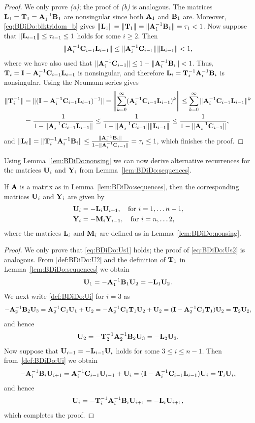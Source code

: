\begin{proof}
We only prove \emph{(a)}; the proof of \emph{(b)} is analogous.
%
The matrices $\mathbf{L}_1=\mathbf{T}_1=\mathbf{A}_1^{-1}\mathbf{B}_1$ are nonsingular since both $\mathbf{A}_1$ and
$\mathbf{B}_1$ are. Moreover, \eqref{eq:BDiDo:blktridom_b} gives
%
$\|\mathbf{L}_1\|=\|\mathbf{T}_1\|=\|\mathbf{A}_1^{-1}\mathbf{B}_1\|=\tau_1<1$.
%
Now suppose that $\|\mathbf{L}_{i-1}\| \leq \tau_{i-1}\leq 1$ holds for some $i\geq 2$.
Then
%
\[\|\mathbf{A}_i^{-1}\mathbf{C}_{i-1}\mathbf{L}_{i-1}\|\leq\|\mathbf{A}_i^{-1}\mathbf{C}_{i-1}\|\|\mathbf{L}_{i-1}\|<1,\]
%
where we have also used that $\|\mathbf{A}_i^{-1}\mathbf{C}_{i-1}\|\leq 1-\|\mathbf{A}_i^{-1}\mathbf{B}_i\|<1$.
Thus,\linebreak
$\mathbf{T}_i=\mathbf{I}-\mathbf{A}_i^{-1}\mathbf{C}_{i-1}\mathbf{L}_{i-1}$ is nonsingular, and therefore
$\mathbf{L}_i=\mathbf{T}_i^{-1}\mathbf{A}_i^{-1}\mathbf{B}_i$ is nonsingular. Using the Neumann series gives
%
\begin{align*}
\|\mathbf{T}_i^{-1}\|&=\|(\mathbf{I}-\mathbf{A}_i^{-1}\mathbf{C}_{i-1}\mathbf{L}_{i-1})^{-1}\|=\left\|\sum_{k=0}^{\infty}(\mathbf{A}_i^{-1}\mathbf{C}_{i-1}\mathbf{L}_{i-1})^{k}\right\|
\leq\sum_{k=0}^{\infty}\|\mathbf{A}_i^{-1}\mathbf{C}_{i-1}\mathbf{L}_{i-1}\|^{k}\\
&=\frac{1}{1-\|\mathbf{A}_i^{-1}\mathbf{C}_{i-1}\mathbf{L}_{i-1}\|}\leq\frac{1}{1-\|\mathbf{A}_i^{-1}\mathbf{C}_{i-1}\|\|\mathbf{L}_{i-1}\|}
\leq\frac{1}{1-\|\mathbf{A}_i^{-1}\mathbf{C}_{i-1}\|},
\end{align*}
%
and $\|\mathbf{L}_i\|=\|\mathbf{T}_i^{-1}\mathbf{A}_i^{-1}\mathbf{B}_i\|\leq\frac{\|\mathbf{A}_i^{-1}\mathbf{B}_i\|}{1-\|\mathbf{A}_i^{-1}\mathbf{C}_{i-1}\|}=\tau_i \leq 1$, which finishes the proof.
%
\end{proof}

Using Lemma~\ref{lem:BDiDo:nonsing} we can now derive alternative recurrences
for the matrices $\mathbf{U}_i$ and $\mathbf{Y}_i$ from Lemma~\ref{lem:BDiDo:sequences}.

\begin{lemma}\label{lem:BDiDo:recurrenceUY}
If $\mathbf{A}$ is a matrix as in Lemma~\ref{lem:BDiDo:sequences}, then the
corresponding matrices $\mathbf{U}_i$ and $\mathbf{Y}_i$ are given by
%
\begin{align}
\mathbf{U}_i &= -\mathbf{L}_i\mathbf{U}_{i+1},  \quad\text{for $i=1,\ldots n-1$},\label{eq:BDiDo:Us1}\\
\mathbf{Y}_i &= -\mathbf{M}_{i}\mathbf{Y}_{i-1}, \quad \text{for $i=n,\ldots 2$},\label{eq:BDiDo:Us2}
\end{align}
where the matrices $\mathbf{L}_i$ and $\mathbf{M}_i$ are defined as in
Lemma~\ref{lem:BDiDo:nonsing}.
\end{lemma}


\begin{proof}
We only prove that \eqref{eq:BDiDo:Us1} holds; the proof of
\eqref{eq:BDiDo:Us2} is analogous.
%
From \eqref{def:BDiDo:U2} and the definition of $\mathbf{T}_1$ in
Lemma~\ref{lem:BDiDo:sequences} we obtain
%
\begin{equation*}%
\U_1=-\A_1^{-1}\B_1\U_2=-\L_1\U_2.
\end{equation*}
%
We next write \eqref{def:BDiDo:Ui} for $i=3$ as
\[
-\mathbf{A}_2^{-1}\mathbf{B}_2\mathbf{U}_3=\mathbf{A}_2^{-1}\mathbf{C}_1\mathbf{U}_1+\mathbf{U}_2=-\mathbf{A}_2^{-1}\mathbf{C}_1\mathbf{T}_1\mathbf{U}_2+\mathbf{U}_2=(\mathbf{I}-\mathbf{A}_2^{-1}\mathbf{C}_1\mathbf{T}_1)\mathbf{U}_2=\mathbf{T}_2\mathbf{U}_2,
\]
and hence
\[
\mathbf{U}_2=-\mathbf{T}_2^{-1}\mathbf{A}_2^{-1}\mathbf{B}_2\mathbf{U}_3=-\mathbf{L}_2\mathbf{U}_3.
\]
%
Now suppose that $\mathbf{U}_{i-1}=-\mathbf{L}_{i-1}\mathbf{U}_i$ holds for some $3\leq i\leq n-1$. Then
from~\eqref{def:BDiDo:Ui} we obtain
\[
-\mathbf{A}_{i}^{-1}\mathbf{B}_i\mathbf{U}_{i+1}=\mathbf{A}_i^{-1}\mathbf{C}_{i-1}\mathbf{U}_{i-1}+\mathbf{U}_{i}=(\mathbf{I}-\mathbf{A}_i^{-1}\mathbf{C}_{i-1}\mathbf{L}_{i-1})\mathbf{U}_{i}=\mathbf{T}_i\mathbf{U}_i,
\]
and hence
\[
\mathbf{U}_i=-\mathbf{T}_i^{-1}\mathbf{A}_i^{-1}\mathbf{B}_i\mathbf{U}_{i+1}=-\mathbf{L}_i\mathbf{U}_{i+1},
\]
which completes the proof.
%
\end{proof}

